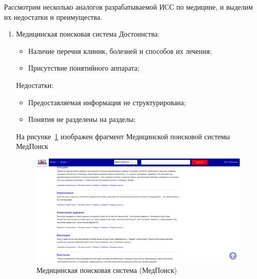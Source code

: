 Рассмотрим несколько аналогов разрабатываемой ИСС по медицине, и выделим их недостатки и преимущества.
\begin{enumerate}
    \item{
    Медицинская поисковая система \cite{medpoisk}
        \newline
        Достоинства:
        \begin{itemize}
            \item{Наличие перечня клиник, болезней и способов их лечения;}
            \item{Присутствие понятийного аппарата;}
        \end{itemize}
        Недостатки:
        \begin{itemize}
            \item Предоставляемая информация не структурирована;
            \item Понятия не разделены на разделы;\\
        \end{itemize}
    На рисунке~\ref{fig:sections/medpoisk} изображен фрагмент Медицинской поисковой системы МедПоиск
    \begin{figure}[H]
    	\centering
    	\includegraphics[width=1.0\textwidth]{sections/medpoisk}
    	\caption{Медицинская поисковая система (МедПоиск)}
     	\label{fig:sections/medpoisk}
    \end{figure}    
    }   


\end{enumerate}
